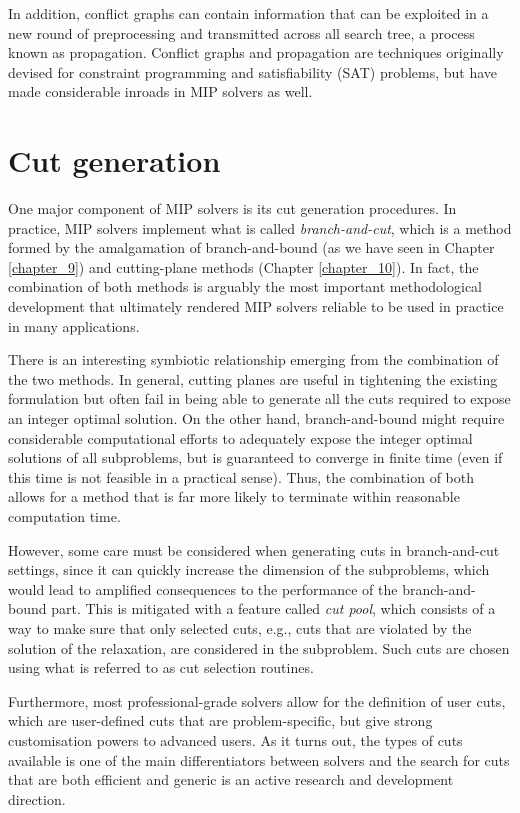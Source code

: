 In addition, conflict graphs can contain information that can be exploited in a new round of preprocessing and transmitted across all search tree, a process known as propagation. Conflict graphs and propagation are techniques originally devised for constraint programming and satisfiability (SAT) problems, but have made considerable inroads in MIP solvers as well.


\section{Cut generation}

One major component of MIP solvers is its cut generation procedures. In practice, MIP solvers implement what is called \emph{branch-and-cut}, which is a method formed by the amalgamation of branch-and-bound (as we have seen in Chapter \ref{chapter_9}) and cutting-plane methods (Chapter \ref{chapter_10}). In fact, the combination of both methods is arguably the most important methodological development that ultimately rendered MIP solvers reliable to be used in practice in many applications. 

There is an interesting symbiotic relationship emerging from the combination of the two methods. In general, cutting planes are useful in tightening the existing formulation but often fail in being able to generate all the cuts required to expose an integer optimal solution. On the other hand, branch-and-bound might require considerable computational efforts to adequately expose the integer optimal solutions of all subproblems, but is guaranteed to converge in finite time (even if this time is not feasible in a practical sense). Thus, the combination of both allows for a method that is far more likely to terminate within reasonable computation time.

However, some care must be considered when generating cuts in branch-and-cut settings, since it can quickly increase the dimension of the subproblems, which would lead to amplified consequences to the performance of the branch-and-bound part. This is mitigated with a feature called \emph{cut pool}, which consists of a way to make sure that only selected cuts, e.g., cuts that are violated by the solution of the relaxation, are considered in the subproblem. Such cuts are chosen using what is referred to as cut selection routines.

Furthermore, most professional-grade solvers allow for the definition of user cuts, which are user-defined cuts that are problem-specific, but give strong customisation powers to advanced users. As it turns out, the types of cuts available is one of the main differentiators between solvers and the search for cuts that are both efficient and generic is an active research and development direction.


